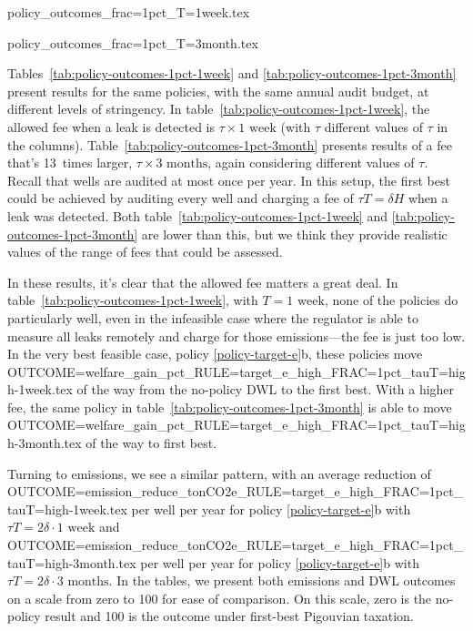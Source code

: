 \documentclass[12pt,oneside,letterpaper]{article}
\theoremstyle{definition}
\begin{document}
\begin{refsection}
\begin{table}[!bth] %
\centering
{policy_outcomes_frac=1pct_T=1week.tex}
\end{table}


\begin{table}[!bth] %
\centering
{policy_outcomes_frac=1pct_T=3month.tex}
\end{table}


Tables~\ref{tab:policy-outcomes-1pct-1week} and \ref{tab:policy-outcomes-1pct-3month}
present results for the same policies, with the same annual audit budget, at different levels of stringency.
In table~\ref{tab:policy-outcomes-1pct-1week}, the allowed fee when a leak is detected is \(\tau \times \text{1 week}\) (with \(\tau\) different values of \(\tau\) in the columns).
Table~\ref{tab:policy-outcomes-1pct-3month} presents results of a fee that's 13~times larger, \(\tau \times \text{3 months}\), again considering different values of \(\tau\).
Recall that wells are audited at most once per year.
In this setup, the first best could be achieved by auditing every well and charging a fee of \(\tau T = \delta H\) when a leak was detected.
Both table~\ref{tab:policy-outcomes-1pct-1week} and \ref{tab:policy-outcomes-1pct-3month}
are lower than this, but we think they provide realistic values of the range of fees that could be assessed.


In these results, it's clear that the allowed fee matters a great deal.
In table~\ref{tab:policy-outcomes-1pct-1week}, with \(T=\text{1 week}\), none of the policies do particularly well, even in the infeasible case where the regulator is able to measure all leaks remotely and charge for those emissions---the fee is just too low.
In the very best feasible case, policy \ref{policy-target-e}b, these policies move
{OUTCOME=welfare_gain_pct_RULE=target_e_high_FRAC=1pct_tauT=high-1week.tex}
of the way from the no-policy \gls{DWL} to the first best.
With a higher fee, the same policy in table~\ref{tab:policy-outcomes-1pct-3month} is able to move
{OUTCOME=welfare_gain_pct_RULE=target_e_high_FRAC=1pct_tauT=high-3month.tex} of the way to first best.

Turning to emissions, we see a similar pattern, with an average reduction of
{OUTCOME=emission_reduce_tonCO2e_RULE=target_e_high_FRAC=1pct_tauT=high-1week.tex}  per well per year for policy \ref{policy-target-e}b with \(\tau T = 2\delta \cdot \text{1 week}\) and
{OUTCOME=emission_reduce_tonCO2e_RULE=target_e_high_FRAC=1pct_tauT=high-3month.tex}  per well per year for policy \ref{policy-target-e}b with \(\tau T = 2\delta \cdot \text{3 months}\).
In the tables, we present both emissions and \gls{DWL} outcomes on a scale from zero to 100 for ease of comparison.
On this scale, zero is the no-policy result and 100 is the outcome under first-best Pigouvian taxation.


\end{refsection}
\end{document}
